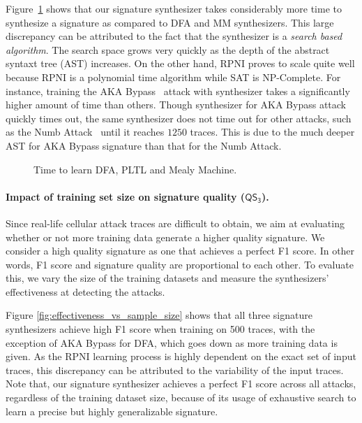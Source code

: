 Figure~\ref{fig:learning_time} shows that our \pltl signature synthesizer takes considerably more time to
synthesize a signature as compared to DFA and MM synthesizers. This large discrepancy can be attributed to the fact
that the \pltl synthesizer is a \emph{search based algorithm}. The search space
grows very quickly as the depth of the abstract syntaxt tree (AST) increases. On the other hand,
RPNI \cite{rpni} proves to scale quite well because RPNI is a polynomial time algorithm while SAT is NP-Complete.
For instance, training the AKA Bypass~\cite{kim_ltefuzz_sp19} attack with \pltl synthesizer takes a significantly higher amount
of time than others. Though \pltl synthesizer for AKA Bypass attack quickly times out,
the same synthesizer does not time out for other attacks, such as the Numb Attack~\cite{lteinspector} until it reaches
$1250$ traces. This is due to the much deeper AST for AKA Bypass \pltl signature than that for the Numb Attack.

\begin{figure}[t]
 \centering
 \resizebox{.8\columnwidth}{!}{}
 \caption{Time to learn DFA, PLTL and Mealy Machine.
 }
 \label{fig:learning_time}
\end{figure}

\paragraph{Impact of training set size on signature quality ($\mathsf{QS_3}$).}
Since real-life cellular attack traces are difficult to obtain,
we aim at evaluating whether or not more training data generate a
higher quality signature. We consider a high quality signature as
one that achieves a perfect F1 score. In other words, F1 score and signature quality are proportional to each other. To
evaluate this, we vary the size of the training datasets
and measure the synthesizers' effectiveness at detecting the attacks. %

Figure \ref{fig:effectiveness_vs_sample_size}
shows that all three signature synthesizers achieve high F1 score when
training on 500 traces, with the exception of AKA Bypass for DFA, which
goes down as more training data is given. As the RPNI learning process
is highly dependent on the exact set of input traces, this discrepancy can be
attributed to the variability of the input traces. Note that, our \pltl signature synthesizer
achieves a perfect F1 score across all attacks, regardless of the training
dataset size, because of its usage of exhaustive search to learn a
precise but highly generalizable signature.


